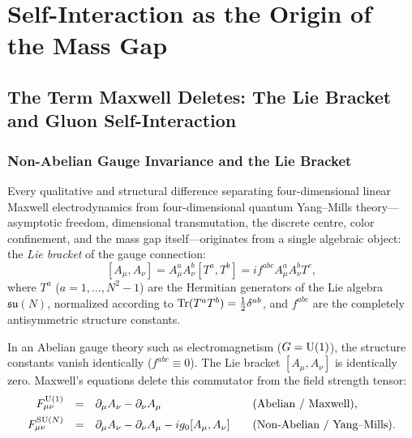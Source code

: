 \chapter{Self-Interaction as the Origin of the Mass Gap}
\label{ch:selfint}
\label{ch:self_interaction_origin}

\section{The Term Maxwell Deletes: The Lie Bracket and Gluon Self-Interaction}
\label{sec:term_maxwell_deletes}

\subsection{Non-Abelian Gauge Invariance and the Lie Bracket}
\label{subsec:nonabelian_lie_bracket}

Every qualitative and structural difference separating four-dimensional linear Maxwell electrodynamics from four-dimensional quantum Yang--Mills theory—asymptotic freedom, dimensional transmutation, the discrete centre, color confinement, and the mass gap itself—originates from a single algebraic object: the \emph{Lie bracket} of the gauge connection:
\begin{equation}
\label{eq:ch10_lie_bracket_def}
[A_\mu, A_\nu] = A_\mu^a A_\nu^b [T^a, T^b] = i f^{abc} A_\mu^a A_\nu^b T^c,
\end{equation}
where $T^a$ ($a = 1, \dots, N^2-1$) are the Hermitian generators of the Lie algebra $\mathfrak{su}(N)$, normalized according to $\mathrm{Tr}(T^a T^b) = \tfrac{1}{2} \delta^{ab}$, and $f^{abc}$ are the completely antisymmetric structure constants.

In an Abelian gauge theory such as electromagnetism ($G = \mathrm{U}(1)$), the structure constants vanish identically ($f^{abc} \equiv 0$). The Lie bracket $[A_\mu, A_\nu]$ is identically zero. Maxwell's equations delete this commutator from the field strength tensor:
\begin{equation}
\label{eq:ch10_field_strength_comparison}
\begin{array}{r@{\quad=\quad}l@{\qquad}l}
F_{\mu\nu}^{\U(1)} & \partial_\mu A_\nu - \partial_\nu A_\mu & \text{(Abelian / Maxwell)}, \\[1ex]
F_{\mu\nu}^{\SU(N)} & \partial_\mu A_\nu - \partial_\nu A_\mu - i g_0 [A_\mu, A_\nu] & \text{(Non-Abelian / Yang--Mills)}.
\end{array}
\end{equation}

